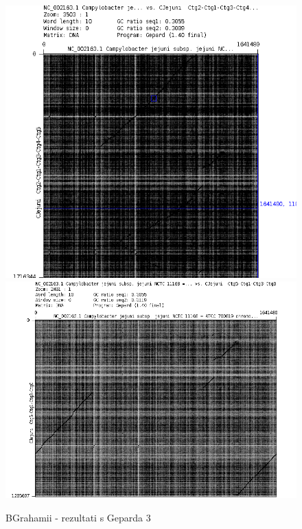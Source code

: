 \begin{figure}[H]
    \centering
    \includegraphics[scale=0.7]{img/Grah2.png}
    \includegraphics[scale=0.5]{img/Grah3.png}
    \caption{BGrahamii - rezultati s Geparda 3}
    \label{fig:grahmi3}
\end{figure}

